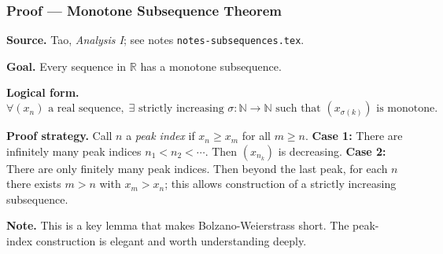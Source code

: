 
\clearpage
{}
\hypertarget{proof-RA-ABB-P-monotone-subseq}{}

\subsubsection[Monotone Subsequence Theorem]{Proof --- Monotone Subsequence Theorem}

\bigskip

\noindent
\textbf{Source.}
Tao, \emph{Analysis I}; see notes \texttt{notes-subsequences.tex}.

\vspace{0.75em}

\noindent
\textbf{Goal.}
Every sequence in $\mathbb{R}$ has a monotone subsequence.

\vspace{0.75em}

\noindent
\textbf{Logical form.}
\[
  \forall (x_n) \text{ a real sequence},\;
  \exists \text{ strictly increasing } \sigma : \mathbb{N} \to \mathbb{N}
  \text{ such that } (x_{\sigma(k)}) \text{ is monotone.}
\]

\vspace{0.75em}

\noindent
\textbf{Proof strategy.}
Call $n$ a \emph{peak index} if $x_n \ge x_m$ for all $m \ge n$.
\textbf{Case 1:} There are infinitely many peak indices $n_1 < n_2 < \cdots$.
Then $(x_{n_k})$ is decreasing.
\textbf{Case 2:} There are only finitely many peak indices. Then beyond
the last peak, for each $n$ there exists $m > n$ with $x_m > x_n$; this
allows construction of a strictly increasing subsequence.

\vspace{0.75em}

\noindent
\textbf{Note.}
This is a key lemma that makes Bolzano-Weierstrass short.
The peak-index construction is elegant and worth understanding deeply.

\vspace{0.75em}

